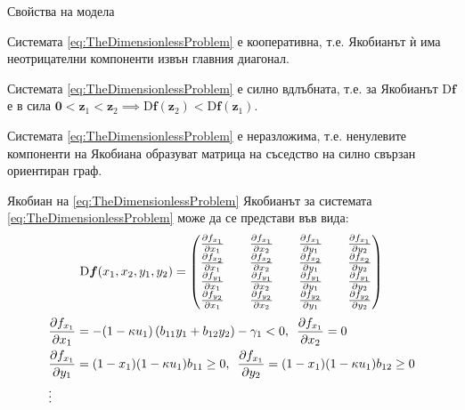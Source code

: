 \begin{frame}[t]{Свойства на модела}
  \begin{proposition}
    Системата \eqref{eq:TheDimensionlessProblem} е кооперативна, т.е. Якобианът ѝ има неотрицателни компоненти извън главния диагонал.
  \end{proposition}

  \begin{proposition}
    Системата \eqref{eq:TheDimensionlessProblem} е силно вдлъбната, т.е. за Якобианът $\mathrm{D}\boldsymbol{f}$ е в сила $\pmb{0} < \boldsymbol{z}_1 < \boldsymbol{z}_2 \implies \mathrm{D}\boldsymbol{f}(\boldsymbol{z}_2) < \mathrm{D}\boldsymbol{f}(\boldsymbol{z}_1)$.
  \end{proposition}

  \begin{proposition}
    Системата \eqref{eq:TheDimensionlessProblem} е неразложима, т.е. ненулевите компоненти на Якобиана образуват матрица на съседство на силно свързан ориентиран граф.
  \end{proposition}
\end{frame}

\begin{frame}[t]{Якобиан на \eqref{eq:TheDimensionlessProblem}}
  Якобианът за системата \eqref{eq:TheDimensionlessProblem} може да се представи във вида:
  \begin{equation*}
    \mathrm{D} \boldsymbol{f}(x_1, x_2, y_1, y_2) =
    \begin{pmatrix}
      \pdv{f_{x_1}}{x_1} && \pdv{f_{x_1}}{x_2} && \pdv{f_{x_1}}{y_1} && \pdv{f_{x_1}}{y_2} \\
      \pdv{f_{x_2}}{x_1} && \pdv{f_{x_2}}{x_2} && \pdv{f_{x_2}}{y_1} && \pdv{f_{x_2}}{y_2} \\
      \pdv{f_{y_1}}{x_1} && \pdv{f_{y_1}}{x_2} && \pdv{f_{y_1}}{y_1} && \pdv{f_{y_1}}{y_2} \\
      \pdv{f_{y_2}}{x_1} && \pdv{f_{y_2}}{x_2} && \pdv{f_{y_2}}{y_1} && \pdv{f_{y_2}}{y_2}
    \end{pmatrix}
  \end{equation*}
  \label{eq:JacobianElements}
  \begin{equation*}
    \begin{split}
      &\pdv{f_{x_1}}{x_1} = -(1-\kappa u_1) \left(b_{11} y_1 + b_{12} y_2\right) - \gamma_1 < 0, \hspace{0.5em}
      \pdv{f_{x_1}}{x_2} = 0 \\
      &\pdv{f_{x_1}}{y_1} = (1-x_1) (1-\kappa u_1) b_{11} \geq 0, \hspace{0.5em}
      \pdv{f_{x_1}}{y_2} = (1-x_1) (1-\kappa u_1) b_{12} \geq 0\\
      &\vdots
    \end{split}
  \end{equation*}
\end{frame}

